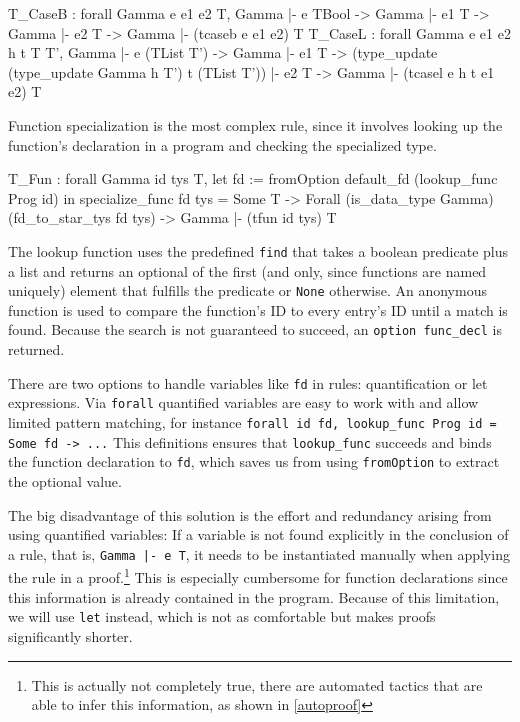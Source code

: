 \documentclass[paper = a4, fleqn, abstract=on, twoside]{scrreprt}
\newcommand{\coqinline}[1]{\texttt{#1}}
\begin{document}
\begin{coqcode}
T_CaseB : forall Gamma e e1 e2 T,
            Gamma |- e \in TBool -> Gamma |- e1 \in T -> Gamma |- e2 \in T ->
            Gamma |- (tcaseb e e1 e2) \in T
T_CaseL : forall Gamma e e1 e2 h t T T',
            Gamma |- e \in (TList T') -> Gamma |- e1 \in T ->
            (type_update (type_update Gamma h T') t (TList T')) |- e2 \in T ->
            Gamma |- (tcasel e h t e1 e2) \in T
\end{coqcode}
Function specialization is the most complex rule, since it involves looking up the function's declaration in a program and checking the specialized type.
\begin{coqcode}
T_Fun : forall Gamma id tys T,
          let fd := fromOption default_fd (lookup_func Prog id) in 
          specialize_func fd tys = Some T ->
          Forall (is_data_type Gamma) (fd_to_star_tys fd tys) ->
          Gamma |- (tfun id tys) \in T
\end{coqcode}
The lookup function uses the predefined \coqinline{find} that takes a boolean predicate plus a list and returns an optional of the first (and only, since functions are named uniquely) element that fulfills the predicate or \coqinline{None} otherwise. An anonymous function is used to compare the function's ID to every entry's ID until a match is found. Because the search is not guaranteed to succeed, an \coqinline{option func_decl} is returned. 
\par 
There are two options to handle variables like \texttt{fd} in rules: quantification or let expressions. Via \coqinline{forall} quantified variables are easy to work with and allow limited pattern matching, for instance \coqinline{forall id fd, lookup_func Prog id = Some fd -> ...} This definitions ensures that \coqinline{lookup_func} succeeds and binds the function declaration to \coqinline{fd}, which saves us from using \coqinline{fromOption} to extract the optional value.
\par
 The big disadvantage of this solution is the effort and redundancy arising from using quantified variables: If a variable is not found explicitly in the conclusion of a rule, that is, \coqinline{Gamma |- e \in T}, it needs to be instantiated manually when applying the rule in a proof.\footnote{This is actually not completely true, there are automated tactics that are able to infer this information, as shown in \autoref{autoproof}} This is especially cumbersome for function declarations since this information is already contained in the program. Because of this limitation, we will use \coqinline{let} instead, which is not as comfortable but makes proofs significantly shorter.
\end{document}
